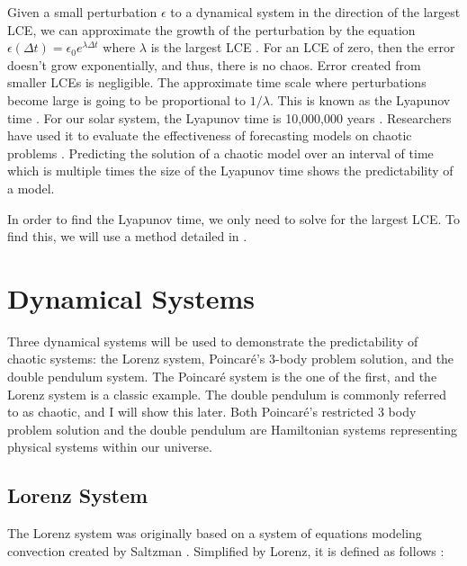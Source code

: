 \documentclass{article}
\begin{document}
Given a small perturbation $\epsilon$ to a dynamical system in the direction of 
the largest LCE, we can approximate the growth of the perturbation by the 
equation $\epsilon(\Delta t) = \epsilon_0 e^{\lambda \Delta t}$ where $\lambda$ 
is the largest LCE
\cite{bezruchko2010extracting}. For an LCE of zero, then the error doesn't grow
exponentially, and thus, there is no chaos. Error created
from smaller LCEs is negligible. The approximate time scale where 
perturbations become large is going to be proportional to $1 / \lambda$. This is
known as the Lyapunov time \cite{bezruchko2010extracting}. For our solar
system, the Lyapunov time is 10,000,000 years \cite{oestreicher2007history}.
Researchers have used it to evaluate the effectiveness of forecasting models on
chaotic problems \cite{pathak2018model}. Predicting the solution of
a chaotic model over an interval of time which is multiple times the size of the
Lyapunov time shows the predictability of a model.

In order to find the Lyapunov time, we only need to solve for the largest LCE. 
To find this, we will use a method detailed in \cite{viswanath1998lyapunov}.


\section{Dynamical Systems}

Three dynamical systems will be used to demonstrate the predictability of 
chaotic systems: the Lorenz system, Poincaré's 3-body 
problem solution, and the double pendulum system.
The Poincaré system is the one of the first, and the Lorenz system
is a classic example. The double pendulum is commonly referred to as chaotic, 
and I will show this later. Both Poincaré's restricted 3 body problem solution
and 
the double pendulum are Hamiltonian systems representing physical systems
within our universe.


\subsection{Lorenz System}


The Lorenz system was originally based on a system of equations modeling 
convection created by Saltzman \cite{lorenz1963deterministic} 
\cite{saltzman1962finite}. Simplified by Lorenz, it is defined as follows
\cite{lorenz1963deterministic}:
\end{document}
